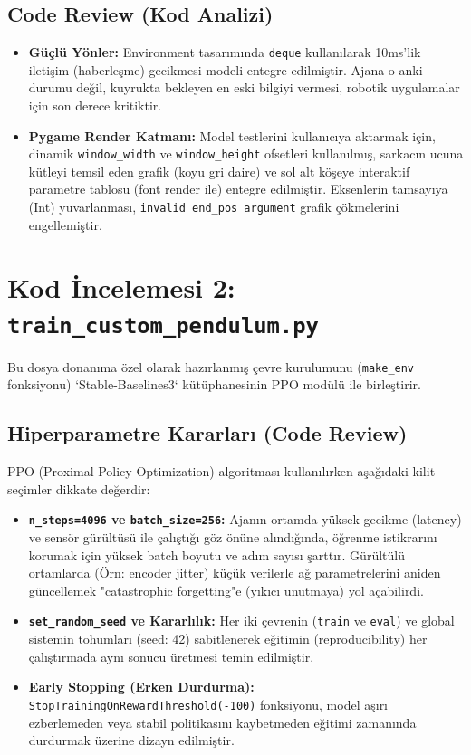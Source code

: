 \documentclass[12pt,a4paper]{article}
\begin{document}
\subsection{Code Review (Kod Analizi)}
\begin{itemize}
    \item \textbf{Güçlü Yönler:} Environment tasarımında \texttt{deque} kullanılarak 10ms'lik iletişim (haberleşme) gecikmesi modeli entegre edilmiştir. Ajana o anki durumu değil, kuyrukta bekleyen en eski bilgiyi vermesi, robotik uygulamalar için son derece kritiktir.
    \item \textbf{Pygame Render Katmanı:} Model testlerini kullanıcıya aktarmak için, dinamik \texttt{window\_width} ve \texttt{window\_height} ofsetleri kullanılmış, sarkacın ucuna kütleyi temsil eden grafik (koyu gri daire) ve sol alt köşeye interaktif parametre tablosu (font render ile) entegre edilmiştir. Eksenlerin tamsayıya (Int) yuvarlanması, \texttt{invalid end\_pos argument} grafik çökmelerini engellemiştir.
\end{itemize}

\newpage
\section{Kod İncelemesi 2: \texttt{train\_custom\_pendulum.py}}
Bu dosya donanıma özel olarak hazırlanmış çevre kurulumunu (\texttt{make\_env} fonksiyonu) `Stable-Baselines3` kütüphanesinin PPO modülü ile birleştirir.

\subsection{Hiperparametre Kararları (Code Review)}
PPO (Proximal Policy Optimization) algoritması kullanılırken aşağıdaki kilit seçimler dikkate değerdir:
\begin{itemize}
    \item \textbf{\texttt{n\_steps=4096} ve \texttt{batch\_size=256}:} Ajanın ortamda yüksek gecikme (latency) ve sensör gürültüsü ile çalıştığı göz önüne alındığında, öğrenme istikrarını korumak için yüksek batch boyutu ve adım sayısı şarttır. Gürültülü ortamlarda (Örn: encoder jitter) küçük verilerle ağ parametrelerini aniden güncellemek "catastrophic forgetting"e (yıkıcı unutmaya) yol açabilirdi.
    \item \textbf{\texttt{set\_random\_seed} ve Kararlılık:} Her iki çevrenin (\texttt{train} ve \texttt{eval}) ve global sistemin tohumları (seed: 42) sabitlenerek eğitimin (reproducibility) her çalıştırmada aynı sonucu üretmesi temin edilmiştir.
    \item \textbf{Early Stopping (Erken Durdurma):} \texttt{StopTrainingOnRewardThreshold(-100)} fonksiyonu, model aşırı ezberlemeden veya stabil politikasını kaybetmeden eğitimi zamanında durdurmak üzerine dizayn edilmiştir.
\end{itemize}
\end{document}
